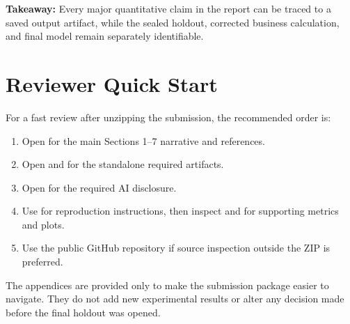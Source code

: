 \documentclass[11pt]{article}
\newcommand{\takeaway}[1]{\vspace{1pt}\noindent\textbf{Takeaway:} #1\vspace{3pt}}
\begin{document}
\takeaway{Every major quantitative claim in the report can be traced to a saved output artifact, while the sealed holdout, corrected business calculation, and final model remain separately identifiable.}

\section{Reviewer Quick Start}

For a fast review after unzipping the submission, the recommended order is:
\begin{enumerate}
    \item Open  for the main Sections 1--7 narrative and references.
    \item Open  and  for the standalone required artifacts.
    \item Open  for the required AI disclosure.
    \item Use  for reproduction instructions, then inspect  and  for supporting metrics and plots.
    \item Use the public GitHub repository if source inspection outside the ZIP is preferred.
\end{enumerate}

The appendices are provided only to make the submission package easier to navigate. They do not add new experimental results or alter any decision made before the final holdout was opened.
\end{document}

